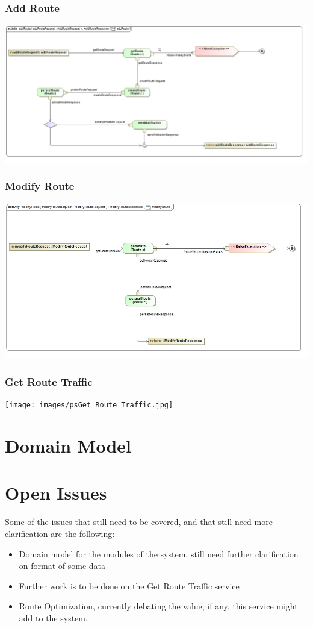 \documentclass[a4paper,12pt]{article}
\begin{document}
\subsubsection{Add Route}
\includegraphics[width=\textwidth]{images/psAdd_Route.jpg}
\subsubsection{Modify Route}
\includegraphics[width=\textwidth]{images/psModify_Route.jpg} 
\subsubsection{Get Route Traffic}
\texttt{[image: images/psGet\_Route\_Traffic.jpg]}

\section{Domain Model}

\section{Open Issues}
Some of the issues that still need to be covered, and that still need more clarification are the following:
\begin{itemize}
\item Domain model for the modules of the system, still need further clarification on format of some data
\item Further work is to be done on the Get Route Traffic service
\item Route Optimization, currently debating the value, if any, this service might add to the system.
\end{itemize}
\end{document}
